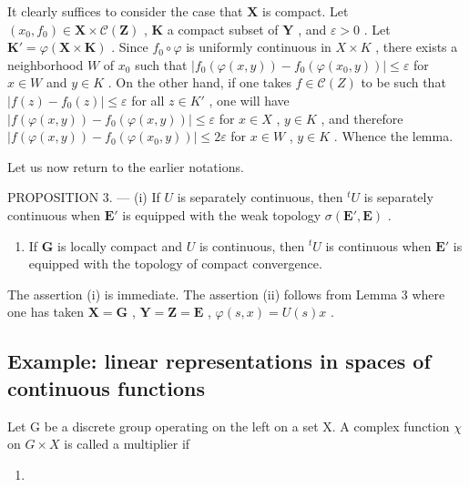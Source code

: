 It clearly suffices to consider the case that \(\mathbf{X}\) is compact. Let \((x_0, f_0) \in \mathbf{X} \times \mathcal{C}(\mathbf{Z})\) , \(\mathbf{K}\) a compact subset of \(\mathbf{Y}\) , and \(\varepsilon > 0\) . Let \(\mathbf{K}' = \varphi(\mathbf{X} \times \mathbf{K})\) . Since \(f_0 \circ \varphi\) is uniformly continuous in \(X \times K\) , there exists a neighborhood \(W\) of \(x_0\) such that \(|f_0(\varphi(x, y)) - f_0(\varphi(x_0, y))| \leqslant \varepsilon\) for \(x \in W\) and \(y \in K\) . On the other hand, if one takes \(f \in \mathcal{C}(Z)\) to be such that \(|f(z) - f_0(z)| \leqslant \varepsilon\) for all \(z \in K'\) , one will have \(|f(\varphi(x, y)) - f_0(\varphi(x, y))| \leqslant \varepsilon\) for \(x \in X\) , \(y \in K\) , and therefore \(|f(\varphi(x, y)) - f_0(\varphi(x_0, y))| \leqslant 2\varepsilon\) for \(x \in W\) , \(y \in K\) . Whence the lemma.

Let us now return to the earlier notations.

PROPOSITION 3. --- (i) If \(U\) is separately continuous, then \({}^t U\) is separately continuous when \(\mathbf{E}'\) is equipped with the weak topology \(\sigma(\mathbf{E}',\mathbf{E})\) .

\begin{enumerate}
\def\labelenumi{(\roman{enumi})}
\setcounter{enumi}{1}
\tightlist
\item
  If \(\mathbf{G}\) is locally compact and \(U\) is continuous, then \({}^t U\) is continuous when \(\mathbf{E}'\) is equipped with the topology of compact convergence.
\end{enumerate}

The assertion (i) is immediate. The assertion (ii) follows from Lemma 3 where one has taken \(\mathbf{X} = \mathbf{G}\) , \(\mathbf{Y} = \mathbf{Z} = \mathbf{E}\) , \(\varphi(s, x) = U(s)x\) .

\subsection{Example: linear representations in spaces of continuous functions}

Let G be a discrete group operating on the left on a set X. A complex function \(\chi\) on \(G \times X\) is called a multiplier if

\begin{enumerate}
\def\labelenumi{(\arabic{enumi})}
\tightlist
\item
\end{enumerate}

